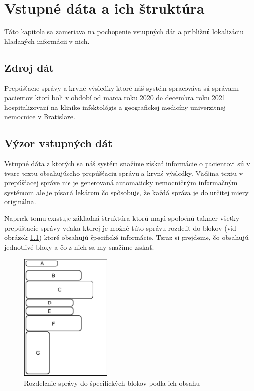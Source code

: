 \chapter{Vstupné dáta a ich štruktúra}

\label{kap:strukSpravy} %

Táto kapitola sa zameriava na pochopenie vstupných dát a približnú lokalizáciu hľadaných informácii v nich.

\section{Zdroj dát}

Prepúšťacie správy a krvné výsledky ktoré náš systém spracováva sú správami pacientov ktorí boli v období od marca roku 2020 do decembra roku 2021 hospitalizovaní na klinike infektológie a geografickej medicíny univerzitnej nemocnice v Bratislave.

\section{Výzor vstupných dát}

Vstupné dáta z ktorých sa náš systém snažíme získať informácie o pacientovi sú v tvare textu obsahujúceho prepúšťaciu správu a krvné výsledky. Väčšina textu v prepúšťacej správe nie je generovaná automaticky nemocničným informačným systémom ale je písaná lekárom čo spôsobuje, že každá správa je do určitej miery originálna.

Napriek tomu existuje základná štruktúra ktorú majú spoločnú takmer všetky prepúšťacie správy vďaka ktorej je možné túto správu rozdeliť do blokov (viď obrázok \ref{obr:sprava}) ktoré obsahujú špecifické informácie. Teraz si prejdeme, čo obsahujú jednotlivé bloky a čo z nich sa my snažíme získať.

\begin{figure}
	\centerline{\includegraphics[width=0.4\textwidth]{images/vyzor_spravy}}
	\caption[Rozloženie správy]{Rozdelenie správy do špecifických blokov podľa ich obsahu}
	\label{obr:sprava}
\end{figure}

